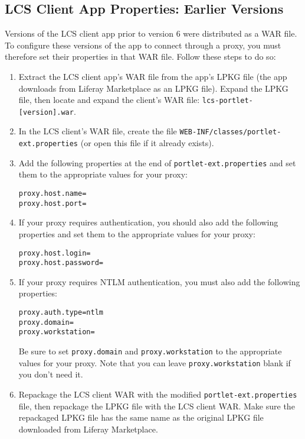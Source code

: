 \subsection{LCS Client App Properties: Earlier
Versions}\label{lcs-client-app-properties-earlier-versions}

Versions of the LCS client app prior to version 6 were distributed as a
WAR file. To configure these versions of the app to connect through a
proxy, you must therefore set their properties in that WAR file. Follow
these steps to do so:

\begin{enumerate}
\def\labelenumi{\arabic{enumi}.}
\item
  Extract the LCS client app's WAR file from the app's LPKG file (the
  app downloads from Liferay Marketplace as an LPKG file). Expand the
  LPKG file, then locate and expand the client's WAR file:
  \texttt{lcs-portlet-{[}version{]}.war}.
\item
  In the LCS client's WAR file, create the file
  \texttt{WEB-INF/classes/portlet-ext.properties} (or open this file if
  it already exists).
\item
  Add the following properties at the end of
  \texttt{portlet-ext.properties} and set them to the appropriate values
  for your proxy:

\begin{verbatim}
proxy.host.name=
proxy.host.port=
\end{verbatim}
\item
  If your proxy requires authentication, you should also add the
  following properties and set them to the appropriate values for your
  proxy:

\begin{verbatim}
proxy.host.login=
proxy.host.password=
\end{verbatim}
\item
  If your proxy requires NTLM authentication, you must also add the
  following properties:

\begin{verbatim}
proxy.auth.type=ntlm
proxy.domain=
proxy.workstation=
\end{verbatim}

  Be sure to set \texttt{proxy.domain} and \texttt{proxy.workstation} to
  the appropriate values for your proxy. Note that you can leave
  \texttt{proxy.workstation} blank if you don't need it.
\item
  Repackage the LCS client WAR with the modified
  \texttt{portlet-ext.properties} file, then repackage the LPKG file
  with the LCS client WAR. Make sure the repackaged LPKG file has the
  same name as the original LPKG file downloaded from Liferay
  Marketplace.
\end{enumerate}

